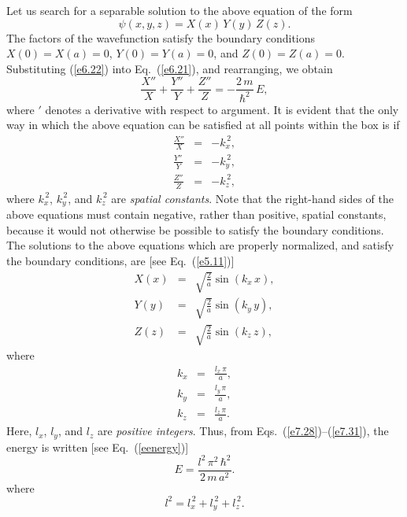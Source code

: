 Let us search for a separable solution to the above equation of the
form
\begin{equation}\label{e6.22}
\psi(x,y,z) = X(x)\,Y(y)\,Z(z).
\end{equation}
The factors of the wavefunction satisfy the boundary conditions
$X(0)=X(a)=0$, $Y(0)=Y(a)=0$, and $Z(0)=Z(a)= 0$.
Substituting (\ref{e6.22}) into Eq.~(\ref{e6.21}), and rearranging, we
obtain
\begin{equation}\label{e7.28}
\frac{X''}{X} + \frac{Y''}{Y} + \frac{Z''}{Z} = -\frac{2\,m}{\hbar^2}\,E,
\end{equation}
where $'$ denotes a derivative with respect to argument. It is evident that
the only way in which the above equation can be satisfied at all points
within the box is if
\begin{eqnarray}
\frac{X''}{X} &=& - k_x^{\,2},\\[0.5ex]
\frac{Y''}{Y} &=& - k_y^{\,2},\\[0.5ex]
\frac{Z''}{Z} &=& - k_z^{\,2},\label{e7.31}
\end{eqnarray}
where $k_x^{\,2}$, $k_y^{\,2}$, and $k_z^{\,2}$ are {\em spatial constants}. Note that the right-hand
sides of the above equations must contain  negative, rather than positive,
spatial constants, because it would not otherwise be possible to satisfy the
boundary conditions. The solutions to the above equations which are properly
normalized, and satisfy the boundary conditions, are [see Eq.~(\ref{e5.11})]
\begin{eqnarray}
X(x) &=& \sqrt{\frac{2}{a}}\sin (k_x\,x),\\[0.5ex]
Y(y) &=& \sqrt{\frac{2}{a}}\sin (k_y\,y),\\[0.5ex]
Z(z) &=& \sqrt{\frac{2}{a}}\sin (k_z\,z),
\end{eqnarray}
where
\begin{eqnarray}
k_x &=& \frac{l_x\,\pi}{a},\\[0.5ex]
k_y &=& \frac{l_y\,\pi}{a},\\[0.5ex]
k_z &=& \frac{l_z\,\pi}{a}.
\end{eqnarray}
Here, $l_x$, $l_y$, and $l_z$ are {\em positive integers}.
Thus, from Eqs.~(\ref{e7.28})--(\ref{e7.31}), the energy is written [see Eq.~(\ref{eenergy})]
\begin{equation}\label{e7.38}
E = \frac{l^2\,\pi^2\,\hbar^2}{2\,m\,a^2}.
\end{equation}
where
\begin{equation}\label{e7.39}
l^2 = l_x^{\,2} + l_y^{\,2}+ l_z^{\,2}.
\end{equation}

